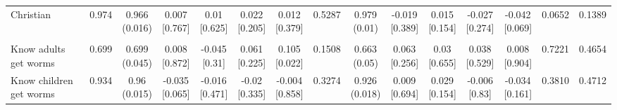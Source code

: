 {\begin{tabular}[t]{lcccccccccccccc}
\hspace{1em}Christian & 0.974 & \makecell[c]{0.966\\(0.016)} & \makecell[c]{0.007\\{[0.767]}} & \makecell[c]{0.01\\{[0.625]}} & \makecell[c]{0.022\\{[0.205]}} & \makecell[c]{0.012\\{[0.379]}} & 0.5287 & \makecell[c]{0.979\\(0.01)} & \makecell[c]{-0.019\\{[0.389]}} & \makecell[c]{0.015\\{[0.154]}} & \makecell[c]{-0.027\\{[0.274]}} & \makecell[c]{-0.042\\{[0.069]}} & 0.0652 & 0.1389\\
\addlinespace[0.3em]
\hline
\multicolumn{15}{l}{\textit{\textbf{Panel C: Deworming knowledge, $N=1,995$}}}\\
\hline
\hspace{1em}Know adults get worms & 0.699 & \makecell[c]{0.699\\(0.045)} & \makecell[c]{0.008\\{[0.872]}} & \makecell[c]{-0.045\\{[0.31]}} & \makecell[c]{0.061\\{[0.225]}} & \makecell[c]{0.105\\{[0.022]}} & 0.1508 & \makecell[c]{0.663\\(0.05)} & \makecell[c]{0.063\\{[0.256]}} & \makecell[c]{0.03\\{[0.655]}} & \makecell[c]{0.038\\{[0.529]}} & \makecell[c]{0.008\\{[0.904]}} & 0.7221 & 0.4654\\
\hspace{1em}Know children get worms & 0.934 & \makecell[c]{0.96\\(0.015)} & \makecell[c]{-0.035\\{[0.065]}} & \makecell[c]{-0.016\\{[0.471]}} & \makecell[c]{-0.02\\{[0.335]}} & \makecell[c]{-0.004\\{[0.858]}} & 0.3274 & \makecell[c]{0.926\\(0.018)} & \makecell[c]{0.009\\{[0.694]}} & \makecell[c]{0.029\\{[0.154]}} & \makecell[c]{-0.006\\{[0.83]}} & \makecell[c]{-0.034\\{[0.161]}} & 0.3810 & 0.4712\\

\end{tabular}}
